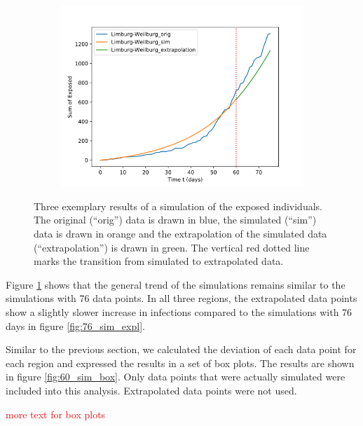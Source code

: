 \begin{figure}
\begin{subfigure}[b]{0.3\textwidth}
		\includegraphics[width=\textwidth]{./figures/60d/10_Limburg-Weilburg.png}	
		\caption{}
	\end{subfigure}
	\caption{Three exemplary results of a simulation of the exposed individuals. The original (``orig'') data is drawn in blue,
		the simulated (``sim'') data is drawn in orange and the extrapolation of the simulated data (``extrapolation'') is
		drawn in green. The vertical red dotted line marks the transition from simulated to extrapolated data.
		}
	\label{fig:60_sim_expl}
\end{figure}

Figure \ref*{fig:60_sim_expl} shows that the general trend of the simulations remains similar to the simulations with 76 data points.
In all three regions, the extrapolated data points show a slightly slower increase in infections compared to the simulations
with 76 days in figure \ref*{fig:76_sim_expl}.

Similar to the previous section, we calculated the deviation of each data point for
each region and expressed the results in a set of box plots. The results are shown in figure \ref*{fig:60_sim_box}. Only data points
that were actually simulated were included into this analysis. Extrapolated data points were not used.

\textcolor{red}{more text for box plots}



